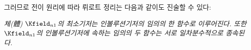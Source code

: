 
그러므로 전이 원리에 따라 뤼로트 정리는 다음과 같이도 진술할 수 있다:

\emph{체(體) $\Kfield_{n1}$의 최소기저는 인볼루션기저의 임의의 한 함수로 이루어진다. 또한 $\Kfield_{n1}$의 인볼루션기저에 속하는 임의의 두 함수는 서로 일차분수적으로 종속된다.}
